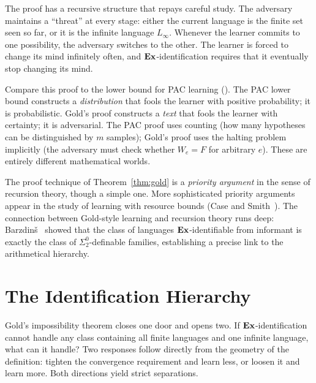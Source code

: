 The proof has a recursive structure that repays careful study. The adversary maintains a ``threat'' at every stage: either the current language is the finite set seen so far, or it is the infinite language $L_\infty$. Whenever the learner commits to one possibility, the adversary switches to the other. The learner is forced to change its mind infinitely often, and $\mathbf{Ex}$-identification requires that it eventually stop changing its mind.

\begin{remark}
\label{rmk:diag-vs-conc}
Compare this proof to the lower bound for PAC learning (). The PAC lower bound constructs a \emph{distribution} that fools the learner with positive probability; it is probabilistic. Gold's proof constructs a \emph{text} that fools the learner with certainty; it is adversarial. The PAC proof uses counting (how many hypotheses can be distinguished by $m$ samples); Gold's proof uses the halting problem implicitly (the adversary must check whether $W_e = F$ for arbitrary $e$). These are entirely different mathematical worlds.
\end{remark}

\begin{historical}
The proof technique of Theorem~\ref{thm:gold} is a \emph{priority argument} in the sense of recursion theory, though a simple one. More sophisticated priority arguments appear in the study of learning with resource bounds (Case and Smith~\cite{CaseSmith1983}). The connection between Gold-style learning and recursion theory runs deep: Barzdin\v{s}~\cite{Barzdinsh1974} showed that the class of languages $\mathbf{Ex}$-identifiable from informant is exactly the class of $\Sigma^0_2$-definable families, establishing a precise link to the arithmetical hierarchy.
\end{historical}


\section{The Identification Hierarchy}
\label{sec:hierarchy}

Gold's impossibility theorem closes one door and opens two. If $\mathbf{Ex}$-identification cannot handle any class containing all finite languages and one infinite language, what can it handle? Two responses follow directly from the geometry of the definition: tighten the convergence requirement and learn less, or loosen it and learn more. Both directions yield strict separations.

